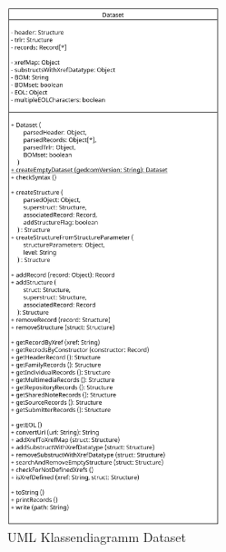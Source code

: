 \begin{figure}[h]
	\centering
	\includegraphics[width=0.55\textwidth]{images/UML_Class_Dataset.png}
	\caption{UML Klassendiagramm Dataset}
	\label{fig: UML Klassendiagramm Dataset}
\end{figure}
\newpage

